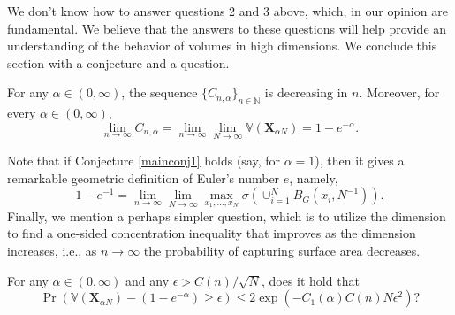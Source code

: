 We don't know how to answer questions 2 and 3 above, which, in our opinion are fundamental. We believe that the answers to these questions will help provide an understanding of the behavior of volumes in high dimensions.  We conclude this section with a conjecture and a question.
\begin{conj}\label{mainconj1}
	For any $\alpha \in (0,\infty)$, the sequence $\{C_{n,\alpha}\}_{n \in \mathbb{N}}$ is decreasing in $n$. Moreover, for every $ \alpha \in (0,\infty)$,
	\[	
		\lim_{n \to \infty}C_{n,\alpha} = \lim_{n \to \infty}\lim_{N \to \infty}\mathbb{V}(\mathbf{X}_{\alpha N}) = 1-e^{-\alpha}.
	\]
\end{conj}
Note that if Conjecture \ref{mainconj1}  holds (say, for $\alpha=1$), then it gives a remarkable geometric definition of  Euler's number $e$, namely,
\begin{equation}\label{eulerconj}
1-e^{-1} = \lim_{n\to\infty}\lim_{N\to\infty}\max_{x_1,\ldots,x_N}\sigma\left(\cup_{i=1}^N B_G(x_i,N^{-1})\right).
\end{equation}
Finally, we mention a perhaps simpler question, which is to utilize the dimension to find a one-sided concentration inequality that improves as the dimension increases, i.e., as $n\to\infty$ the probability of capturing surface area decreases. 
\begin{ques}
		For any $\alpha \in (0,\infty)$ and any $\epsilon > C(n)/\sqrt{N}$, does it hold that
		\[
			\Pr( \mathbb{V}(\mathbf{X}_{\alpha N}) - (1-e^{-\alpha}) \geq \epsilon) \leq 2\exp\left(-C_1(\alpha)C(n)N\epsilon^2\right)?
		\]
\end{ques}



% 	



